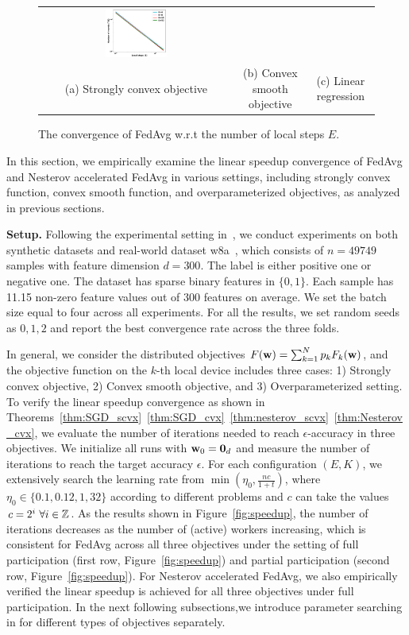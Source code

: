 \begin{figure}[h!]
\begin{tabular}{ccc}
	\includegraphics[width=0.33\textwidth]{fig/paper-linregression-newspeedupEpochsRounds-min-linearregressionw8a-epsilon002-reg0.pdf} \\
(a) Strongly convex objective & (b) Convex smooth objective & (c) Linear regression
	\end{tabular}
\caption{The convergence of FedAvg w.r.t the number of local steps $E$. }
\label{fig:e}
\end{figure}


In this section, we empirically examine the linear speedup convergence of FedAvg and Nesterov accelerated FedAvg in various settings, including strongly convex function, convex smooth function, and overparameterized objectives, as analyzed in previous sections.

\textbf{Setup.} Following the experimental setting in~\cite{stich2018local}, we
conduct experiments on both synthetic datasets and real-world dataset
w8a~\cite{platt1998fast}, which consists of $n = 49749 $ samples with
feature dimension $d = 300$. The label is either positive one or negative one.
The dataset has sparse binary features in $\{0, 1\}$. Each sample
has 11.15 non-zero feature values out of $300$ features on average.
We set the batch size equal to four across all experiments.
For all the results, we set random seeds as $0, 1, 2$
and report the best convergence rate across the three folds. 


In general, we consider the distributed
objectives $F({\mathbf{w}}) = \sum_{k=1}^N p_kF_k({\mathbf{w}})$, and the objective function on the
$k$-th local device includes three cases: 1) Strongly convex
objective, 2) Convex smooth objective, and 3) Overparameterized setting.
To verify the linear speedup convergence as shown in Theorems~\ref{thm:SGD_scvx}~\ref{thm:SGD_cvx}~\ref{thm:nesterov_scvx}~\ref{thm:Nesterov_cvx}, we evaluate the number of iterations needed to reach
$\epsilon$-accuracy in three objectives. We initialize all runs with ${\mathbf{w}}_0 = \textbf{0}_d$ and measure the number of iterations to reach the target accuracy $\epsilon$. For each configuration $(E, K)$, we extensively search the learning rate from $\min(\eta_0, \frac{nc}{1 + t})$, where
$\eta_0 \in \{0.1, 0.12, 1, 32 \}$ according to different problems and $c$ can
take the values $c = 2^i \ \forall i \in \mathbb{Z}$. As the results shown in Figure~\ref{fig:speedup},
the number of iterations decreases as the number of (active) workers increasing, which is consistent for FedAvg across all three objectives under the setting of full participation (first row, Figure~\ref{fig:speedup}) and partial participation (second row, Figure~\ref{fig:speedup}). For Nesterov accelerated FedAvg, we also empirically verified the linear speedup is achieved for all three objectives under full participation.
In the next following subsections,we introduce parameter searching in for different types of objectives separately.

